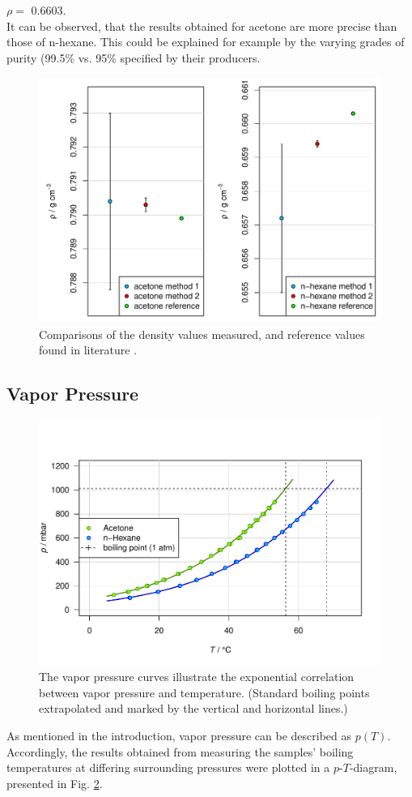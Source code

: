 $\rho = $ \qty{0.6603}{\density}. \cite{meister} 
\\It can be observed, that the results obtained for acetone are more precise than those of n-hexane. This could be explained for example by the varying grades of purity (99.5\% vs. 95\% specified by their producers.
\begin{figure}[H]
    \centering
    \includegraphics[width=.5\textwidth]{figures/rho-comparison.pdf}
    \caption{Comparisons of the density values measured, and reference values found in literature \cite{meister}.}
    \label{fig:rho_comp}
\end{figure}


\subsection{Vapor Pressure}

\begin{figure}[H]
    \centering
    \includegraphics[width=.5\textwidth]{figures/DDR1_t_p.pdf}
    \caption{The vapor pressure curves illustrate the exponential correlation between vapor pressure and temperature. (Standard boiling points extrapolated and marked by the vertical and horizontal lines.)}
    \label{fig:ddr1_t_p}
\end{figure}

As mentioned in the introduction, vapor pressure can be described as $p(T)$. Accordingly, the results obtained from measuring the samples' boiling temperatures at differing surrounding pressures were plotted in a $p$-$T$-diagram, presented in Fig. \ref{fig:ddr1_t_p}.

